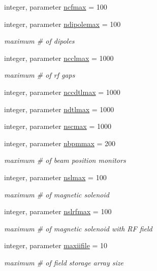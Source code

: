\begin{DoxyCompactItemize}
integer, parameter \mbox{\hyperlink{namespacenumconstclass_a94e49bcdcfdd3ed05de0d41af396f4d1}{ncfmax}} = 100
\item 
integer, parameter \mbox{\hyperlink{namespacenumconstclass_a35f5d91828a6dc16c619583554a1566d}{ndipolemax}} = 100
\begin{DoxyCompactList}\small\item\em maximum \# of dipoles \end{DoxyCompactList}\item 
integer, parameter \mbox{\hyperlink{namespacenumconstclass_ad4189a0ff5d1f4848364ea3012cddfd0}{ncclmax}} = 1000
\begin{DoxyCompactList}\small\item\em maximum \# of rf gaps \end{DoxyCompactList}\item 
integer, parameter \mbox{\hyperlink{namespacenumconstclass_a27ee6b57f509d99358609230f3ea289a}{nccdtlmax}} = 1000
\item 
integer, parameter \mbox{\hyperlink{namespacenumconstclass_a36b8673b359ee1e52cd37349ec8e51ad}{ndtlmax}} = 1000
\item 
integer, parameter \mbox{\hyperlink{namespacenumconstclass_a842fc257d326a7d9ec49e681832e6aa3}{nscmax}} = 1000
\item 
integer, parameter \mbox{\hyperlink{namespacenumconstclass_a2a11d40986bf0aa3873c57eccd9cdfac}{nbpmmax}} = 200
\begin{DoxyCompactList}\small\item\em maximum \# of beam position monitors \end{DoxyCompactList}\item 
integer, parameter \mbox{\hyperlink{namespacenumconstclass_a538bae3eec1dd1a5815019847df66e23}{nslmax}} = 100
\begin{DoxyCompactList}\small\item\em maximum \# of magnetic solenoid \end{DoxyCompactList}\item 
integer, parameter \mbox{\hyperlink{namespacenumconstclass_a454ee9bf5d3755b8cfc222eedcb9495d}{nslrfmax}} = 100
\begin{DoxyCompactList}\small\item\em maximum \# of magnetic solenoid with RF field \end{DoxyCompactList}\item 
integer, parameter \mbox{\hyperlink{namespacenumconstclass_a16c5d12ac247e813b03d87aab5e4dbcb}{maxiifile}} = 10
\begin{DoxyCompactList}\small\item\em maximum \# of field storage array size \end{DoxyCompactList}\item 

\end{DoxyCompactItemize}
